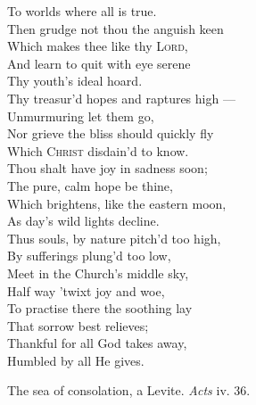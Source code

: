  To worlds where all is true. \\
  Then grudge not thou the anguish keen \\
 Which makes thee like thy \textsc{Lord}, \\
 And learn to quit with eye serene \\
 Thy youth’s ideal hoard. \\
  Thy treasur’d hopes and raptures high — \\
 Unmurmuring let them go, \\
 Nor grieve the bliss should quickly fly \\
 Which \textsc{Christ} disdain’d to know. \\
  Thou shalt have joy in sadness soon; \\
 The pure, calm hope be thine, \\
 Which brightens, like the eastern moon, \\
 As day’s wild lights decline. \\
  Thus souls, by nature pitch’d too high, \\
 By sufferings plung’d too low, \\
 Meet in the Church’s middle sky, \\
 Half way ’twixt joy and woe, \\
  To practise there the soothing lay \\
 That sorrow best relieves; \\
 Thankful for all God takes away, \\
 Humbled by all He gives.\\


The sea of consolation, a Levite. \emph{Acts} iv. 36.

